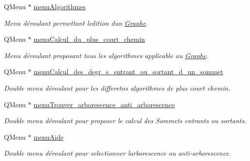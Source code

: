 \begin{DoxyCompactItemize}
Q\+Menu $\ast$ \hyperlink{classUi__MainWindow_a1aaf528d5241537c401c0394be76a0a6}{menu\+Algorithmes}
\begin{DoxyCompactList}\small\item\em Menu d\'{e}roulant permettant l\textquotesingle{}edition d\textquotesingle{}un \hyperlink{classGraphe}{Graphe}. \end{DoxyCompactList}\item 
\mbox{\label{classUi__MainWindow_a4f1e429515e46df9522f3b7216f21c73}} 
Q\+Menu $\ast$ \hyperlink{classUi__MainWindow_a4f1e429515e46df9522f3b7216f21c73}{menu\+Calcul\+\_\+du\+\_\+plus\+\_\+court\+\_\+chemin}
\begin{DoxyCompactList}\small\item\em Menu d\'{e}roulant proposant tous les algorithmes applicable au \hyperlink{classGraphe}{Graphe}. \end{DoxyCompactList}\item 
\mbox{\label{classUi__MainWindow_a941d389d75e49259622102093a842a55}} 
Q\+Menu $\ast$ \hyperlink{classUi__MainWindow_a941d389d75e49259622102093a842a55}{menu\+Calcul\+\_\+des\+\_\+degr\+\_\+s\+\_\+entrant\+\_\+ou\+\_\+sortant\+\_\+d\+\_\+un\+\_\+sommet}
\begin{DoxyCompactList}\small\item\em Double menu d\'{e}roulant pour les differetns algorithmes de plus court chemin. \end{DoxyCompactList}\item 
\mbox{\label{classUi__MainWindow_a8c89f2873b5b2a2595260652a874ea52}} 
Q\+Menu $\ast$ \hyperlink{classUi__MainWindow_a8c89f2873b5b2a2595260652a874ea52}{menu\+Trouver\+\_\+arborescence\+\_\+anti\+\_\+arborescence}
\begin{DoxyCompactList}\small\item\em Double menu d\'{e}roulant pour proposer le calcul des Sommets entrants ou sortants. \end{DoxyCompactList}\item 
\mbox{\label{classUi__MainWindow_a61eb1ec273e70179434e3dca74e10208}} 
Q\+Menu $\ast$ \hyperlink{classUi__MainWindow_a61eb1ec273e70179434e3dca74e10208}{menu\+Aide}
\begin{DoxyCompactList}\small\item\em Double menu d\'{e}roulant pour selectionner l\textquotesingle{}arborescence ou anti-\/arborescence. \end{DoxyCompactList}\item 

\end{DoxyCompactItemize}
